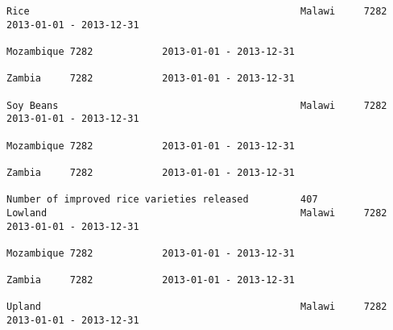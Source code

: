 \documentclass[11pt]{article}
\begin{document}
\begin{Verbatim}[commandchars=\\\{\}]
                                                                                                                                                              Rice                                               Malawi     7282            2013-01-01 - 2013-12-31   
                                                                                                                                                                                                                 Mozambique 7282            2013-01-01 - 2013-12-31   
                                                                                                                                                                                                                 Zambia     7282            2013-01-01 - 2013-12-31   
                                                                                                                                                              Soy Beans                                          Malawi     7282            2013-01-01 - 2013-12-31   
                                                                                                                                                                                                                 Mozambique 7282            2013-01-01 - 2013-12-31   
                                                                                                                                                                                                                 Zambia     7282            2013-01-01 - 2013-12-31   
                                                                         Number of improved rice varieties released         407                               Lowland                                            Malawi     7282            2013-01-01 - 2013-12-31   
                                                                                                                                                                                                                 Mozambique 7282            2013-01-01 - 2013-12-31   
                                                                                                                                                                                                                 Zambia     7282            2013-01-01 - 2013-12-31   
                                                                                                                                                              Upland                                             Malawi     7282            2013-01-01 - 2013-12-31   

\end{Verbatim}
\end{document}
